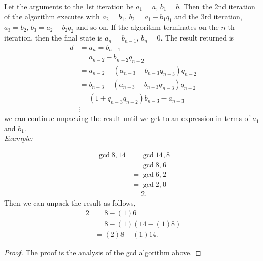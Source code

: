 \documentclass[../MathsNotesBase.tex]{subfiles}
\begin{document}
{		Let the arguments to the 1st iteration be ${ a_1 = a,\, b_1 = b }$. Then the 2nd iteration of the algorithm executes with ${ a_2 = b_1,\, b_2 = a_1 - b_1 q_1 }$ and the 3rd iteration, ${ a_3 = b_2,\, b_3 = a_2 - b_2 q_2 }$ and so on. If the algorithm terminates on the $n$-th iteration, then the final state is ${ a_n = b_{n-1},\, b_n = 0 }$. The result returned is
		\[\begin{aligned}
			d &= a_n = b_{n-1} \\
			&= a_{n-2} - b_{n-2} q_{n-2} \\
			&= a_{n-2} - (a_{n-3} - b_{n-3} q_{n-3}) q_{n-2} \\
			&= b_{n-3} - (a_{n-3} - b_{n-3} q_{n-3}) q_{n-2} \\
			&= (1 + q_{n-3} q_{n-2}) b_{n-3} - a_{n-3} \\
			&\vdots
		\end{aligned}\]
		we can continue unpacking the result until we get to an expression in terms of $a_1$ and $b_1$.\\
		
		\textit{Example:}
		
		\[\begin{aligned}
			\operatorname{gcd} 8,14 &= \operatorname{gcd} 14,8 \\
			&= \operatorname{gcd} 8,6 \\
			&= \operatorname{gcd} 6,2 \\
			&= \operatorname{gcd} 2,0 \\
			&= 2.
		\end{aligned}\]
		Then we can unpack the result as follows,
		\[\begin{aligned}
			2 &= 8 - (1)6 \\
			&= 8 - (1)(14 - (1)8) \\
			&= (2)8 - (1)14.
		\end{aligned}\]



		\bigskip
		\begin{proof}
			The proof is the analysis of the gcd algorithm above. 
		\end{proof}
	
}
\end{document}
